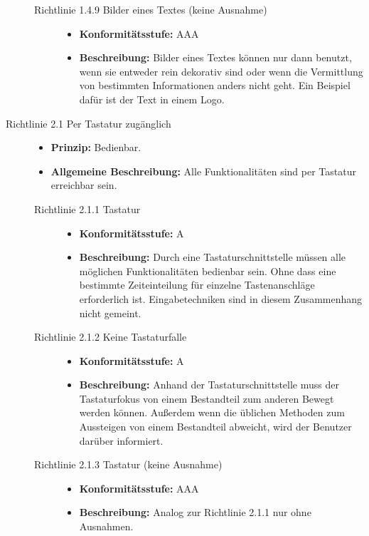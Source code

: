 \begin{description}
\begin{description}
		\item[Richtlinie 1.4.9 Bilder eines Textes (keine Ausnahme)]\hfill
		\begin{itemize}
			\item \textbf{Konformitätsstufe:} AAA
			\item \textbf{Beschreibung:} Bilder eines Textes können nur dann benutzt, wenn sie entweder rein dekorativ sind oder wenn die Vermittlung von bestimmten 
			 Informationen anders nicht geht. Ein Beispiel dafür ist der Text in einem Logo.
		\end{itemize}
	\end{description}
	
	\item[Richtlinie 2.1 Per Tastatur zugänglich]\hfill
	\begin{itemize}
		\item \textbf{Prinzip:} Bedienbar.
		\item \textbf{Allgemeine Beschreibung:} Alle Funktionalitäten sind per Tastatur erreichbar sein.
	\end{itemize}
	
	\begin{description}
		\item[Richtlinie 2.1.1 Tastatur]\hfill
		\begin{itemize}
			\item \textbf{Konformitätsstufe:} A
			\item \textbf{Beschreibung:} Durch eine Tastaturschnittstelle müssen alle möglichen Funktionalitäten bedienbar sein. Ohne dass eine bestimmte 
			Zeiteinteilung für einzelne Tastenanschläge erforderlich ist. Eingabetechniken sind in diesem Zusammenhang nicht gemeint.
		\end{itemize}
		
		\item[Richtlinie 2.1.2 Keine Tastaturfalle]\hfill
		\begin{itemize}
			\item \textbf{Konformitätsstufe:} A
			\item \textbf{Beschreibung:} Anhand der Tastaturschnittstelle muss der Tastaturfokus von einem Bestandteil zum anderen Bewegt werden können. Außerdem wenn 
			die üblichen Methoden zum Aussteigen von einem Bestandteil abweicht, wird der Benutzer darüber informiert.
		\end{itemize}
		
		\item[Richtlinie 2.1.3 Tastatur (keine Ausnahme)]\hfill
		\begin{itemize}
			\item \textbf{Konformitätsstufe:} AAA
			\item \textbf{Beschreibung:} Analog zur Richtlinie 2.1.1 nur ohne Ausnahmen.
		\end{itemize}
	\end{description}
	

\end{description}
